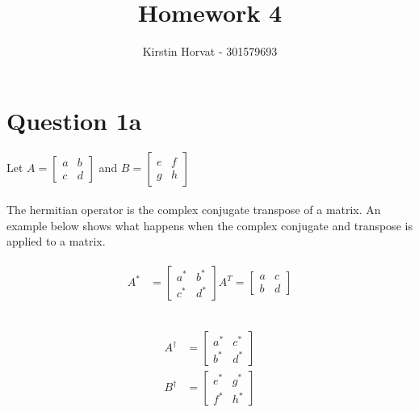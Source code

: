 \documentclass{article}
\title{Homework 4}
\author{Kirstin Horvat - 301579693}
\begin{document}
\maketitle

\section*{Question 1a}
Let \(A = \begin{bmatrix} a & b \\ c & d \end{bmatrix}\) and \(B = \begin{bmatrix} e & f \\ g & h \end{bmatrix}\) \\
\paragraph[short]{} {
    The hermitian operator is the complex conjugate transpose of a matrix. An example below shows what happens when the complex conjugate and transpose is applied to a matrix.
}

\begin{align*}
\begin{split}
    A^* &= \begin{bmatrix} a^* & b^* \\ c^* & d^* \end{bmatrix} A^T = \begin{bmatrix} a & c \\ b & d \end{bmatrix} \\\\
\end{split}
\end{align*}

\begin{align*}
    \begin{split}
        A^{\dagger} &= \begin{bmatrix} a^* & c^* \\ b^* & d^* \end{bmatrix} \\ 
        B^{\dagger} &= \begin{bmatrix} e^* & g^* \\ f^* & h^* \end{bmatrix} \\\\
    \end{split}
\end{align*}
\end{document}
